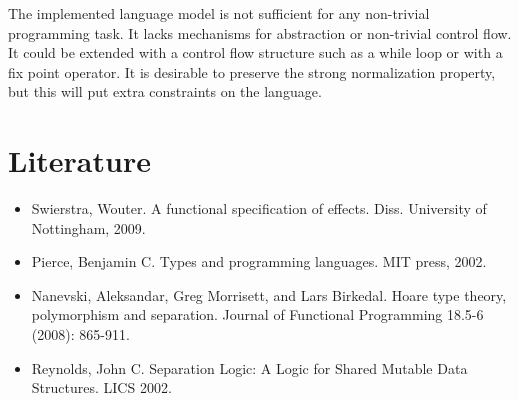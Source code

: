 \documentclass{article}
\begin{document}
The implemented language model is not sufficient for any non-trivial programming task. It lacks mechanisms for abstraction or non-trivial control flow. It could be extended with a control flow structure such as a while loop or with a fix point operator. It is desirable to preserve the strong normalization property, but this will put extra constraints on the language.

\section{Literature}

\begin{itemize}
\item[] Swierstra, Wouter. A functional specification of effects. Diss. University of Nottingham, 2009.

\item[] Pierce, Benjamin C. Types and programming languages. MIT press, 2002.

\item[] Nanevski, Aleksandar, Greg Morrisett, and Lars Birkedal. Hoare type theory, polymorphism and separation. Journal of Functional Programming 18.5-6 (2008): 865-911.

\item[] Reynolds, John C. Separation Logic: A Logic for Shared Mutable Data Structures. LICS 2002.
\end{itemize}
\end{document}
